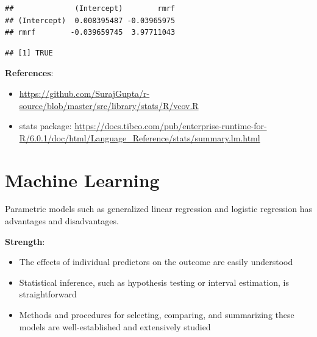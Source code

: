 \documentclass[
  a4paper,
  twoside,
  openright]{book}
\newenvironment{Shaded}{\begin{snugshade}}{\end{snugshade}}
\newcommand{\AttributeTok}[1]{\textcolor[rgb]{0.13,0.29,0.53}{#1}}
\newcommand{\ConstantTok}[1]{\textcolor[rgb]{0.56,0.35,0.01}{#1}}
\newcommand{\FunctionTok}[1]{\textcolor[rgb]{0.13,0.29,0.53}{\textbf{#1}}}
\newcommand{\NormalTok}[1]{#1}
\newcommand{\SpecialCharTok}[1]{\textcolor[rgb]{0.81,0.36,0.00}{\textbf{#1}}}
\providecommand{\tightlist}{%
  \setlength{\itemsep}{0pt}\setlength{\parskip}{0pt}}
\theoremstyle{definition}
\theoremstyle{definition}
\theoremstyle{definition}
\theoremstyle{definition}
\theoremstyle{remark}
\begin{document}
\begin{Shaded}
\end{Shaded}

\begin{verbatim}
##              (Intercept)        rmrf
## (Intercept)  0.008395487 -0.03965975
## rmrf        -0.039659745  3.97711043
\end{verbatim}

\begin{Shaded}
\end{Shaded}

\begin{verbatim}
## [1] TRUE
\end{verbatim}

\textbf{References}:

\begin{itemize}
\tightlist
\item
  \url{https://github.com/SurajGupta/r-source/blob/master/src/library/stats/R/vcov.R}
\item
  stats package: \url{https://docs.tibco.com/pub/enterprise-runtime-for-R/6.0.1/doc/html/Language_Reference/stats/summary.lm.html}
\end{itemize}

\chapter{Machine Learning}\label{machine-learning}

Parametric models such as generalized linear regression and logistic regression has advantages and disadvantages.

\textbf{Strength}:

\begin{itemize}
\tightlist
\item
  The effects of individual predictors on the outcome are easily understood
\item
  Statistical inference, such as hypothesis testing or interval estimation, is straightforward
\item
  Methods and procedures for selecting, comparing, and summarizing these models are well-established and extensively studied
\end{itemize}
\end{document}
